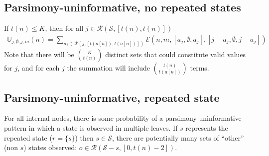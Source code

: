 \documentclass[11pt]{article}
\newcommand{\numStates}{\ensuremath{K}\xspace}
\newcommand{\allStates}{\ensuremath{\mathcal S}\xspace}
\newcommand{\probUninformPatClassSym}{\ensuremath{\mathbb U}\xspace}
\newcommand{\probUninformPatClass}[5]{\ensuremath{\probUninformPatClassSym_{#1,#2,#3,#4}\left(#5\right)}\xspace}
\newcommand{\leftChild}[1]{\ensuremath{a\left[#1\right]}\xspace} %
\newcommand{\numLeaves}[1]{\ensuremath{t\left(#1\right)}\xspace}
\newcommand{\subsetsOfSizeSet}[3]{\ensuremath{\mathcal R}\left(#1,\left[#2,#3\right]\right)\xspace}
\newcommand{\DoubleFelsensteinPruneSym}{{\mathcal{E}}}
\newcommand{\DoubleFelsensteinPruneUninform}[8]{\DoubleFelsensteinPruneSym(#1,#2,\left[#3,#4,#5\right],\left[#6,#7,#8\right])}
\begin{document}
\subsection{Parsimony-uninformative, no repeated states}
If $\numLeaves{n}\leq\numStates$, then for all $j\in\subsetsOfSizeSet{\allStates}{\numLeaves{n}}{\numLeaves{n}}$
\begin{eqnarray}
\probUninformPatClass{j}{\emptyset}{j}{m}{n}= \sum_{a_j\in\subsetsOfSizeSet{j}{\numLeaves{\leftChild{n}}}{\numLeaves{\leftChild{n}}}}\DoubleFelsensteinPruneUninform{n}{m}{a_j}{\emptyset}{a_j}{j-a_j}{\emptyset}{j-a_j}
\end{eqnarray}
Note that there will be $\numStates\choose\numLeaves{n}$ distinct sets that could constitute valid values for $j$, and for each $j$ the summation will include $\numLeaves{n}\choose\numLeaves{\leftChild{n}}$ terms.



\subsection{Parsimony-uninformative, repeated state}
For all internal nodes, there is some probability of a parsimony-uninformative pattern in which a state is observed in multiple leaves.
If $s$ represents the repeated state ($r=\{s\}$) then $s\in \allStates$, there are potentially many sets of ``other'' (non $s$) states observed: $o\in\subsetsOfSizeSet{\allStates-s}{0}{\numLeaves{n}-2}$.
\end{document}
